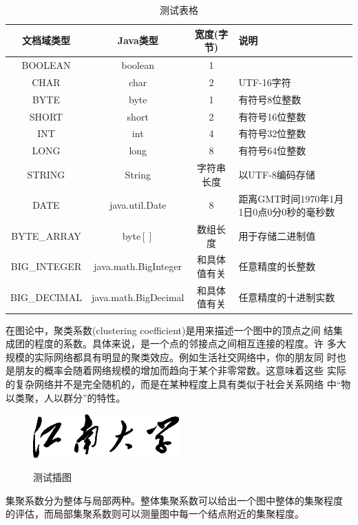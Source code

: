 \begin{table}
  \centering
  \begin{tabular}{cccp{38mm}}
    \toprule
    \textbf{文档域类型} & \textbf{Java类型} & \textbf{宽度(字节)} & \textbf{说明} \\
    \midrule
    BOOLEAN  & boolean &  1  & \\
    CHAR     & char    &  2  & UTF-16字符 \\
    BYTE     & byte    &  1  & 有符号8位整数 \\
    SHORT    & short   &  2  & 有符号16位整数 \\
    INT      & int     &  4  & 有符号32位整数 \\
    LONG     & long    &  8  & 有符号64位整数 \\
    STRING   & String  &  字符串长度  & 以UTF-8编码存储 \\
    DATE     & java.util.Date & 8 & 距离GMT时间1970年1月1日0点0分0秒的毫秒数 \\
    BYTE\_ARRAY & byte$[]$ & 数组长度 & 用于存储二进制值 \\
    BIG\_INTEGER & java.math.BigInteger & 和具体值有关 & 任意精度的长整数 \\
    BIG\_DECIMAL & java.math.BigDecimal & 和具体值有关 & 任意精度的十进制实数 \\
    \bottomrule
  \end{tabular}
  \caption{测试表格}\label{table:test3}
\end{table}

在图论中，聚类系数(clustering coefficient)是用来描述一个图中的顶点之间
结集成团的程度的系数。具体来说，是一个点的邻接点之间相互连接的程度。许
多大规模的实际网络都具有明显的聚类效应。例如生活社交网络中，你的朋友同
时也是朋友的概率会随着网络规模的增加而趋向于某个非零常数。这意味着这些
实际的复杂网络并不是完全随机的，而是在某种程度上具有类似于社会关系网络
中“物以类聚，人以群分”的特性。

\begin{figure}[htbp]
  \centering
  \includegraphics[width= 0.5\textwidth]{jnuname.eps}\\
  \caption{测试插图}\label{fig:test4}
\end{figure}

集聚系数分为整体与局部两种。整体集聚系数可以给出一个图中整体的集聚程度
的评估，而局部集聚系数则可以测量图中每一个结点附近的集聚程度。

